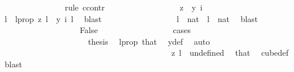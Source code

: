 \begin{isabellebody}
\ \ \ \ \ \ \ \ \ \ \ \ \ \ \isamarkupfalse%
\ {\isacharparenleft}{\kern0pt}rule\ ccontr{\isacharparenright}{\kern0pt}\isanewline
\ \ \ \ \ \ \ \ \ \ \ \ \ \ \ \ \isamarkupfalse%
\ {\isachardoublequoteopen}z\ {\isasymnoteq}\ y\ i{\isachardoublequoteclose}\ \isanewline
\ \ \ \ \ \ \ \ \ \ \ \ \ \ \ \ \isamarkupfalse%
\ \isamarkupfalse%
\ l\ \ l{\isacharunderscore}{\kern0pt}prop{\isacharcolon}{\kern0pt}\ {\isachardoublequoteopen}z\ l\ {\isasymnoteq}\ y\ i\ l{\isachardoublequoteclose}\ \isamarkupfalse%
\ blast\isanewline
\ \ \ \ \ \ \ \ \ \ \ \ \ \ \ \ \isamarkupfalse%
\ {\isachardoublequoteopen}l\ {\isasymin}\ {\isacharbraceleft}{\kern0pt}{\isachardot}{\kern0pt}{\isachardot}{\kern0pt}{\isacharless}{\kern0pt}{}{\isacharcolon}{\kern0pt}{\isacharcolon}{\kern0pt}nat{\isacharbraceright}{\kern0pt}{\isachardoublequoteclose}\ {\isacharbar}{\kern0pt}\ {\isachardoublequoteopen}l\ {\isasymnotin}\ {\isacharbraceleft}{\kern0pt}{\isachardot}{\kern0pt}{\isachardot}{\kern0pt}{\isacharless}{\kern0pt}{}{\isacharcolon}{\kern0pt}{\isacharcolon}{\kern0pt}nat{\isacharbraceright}{\kern0pt}{\isachardoublequoteclose}\ \isamarkupfalse%
\ blast\isanewline
\ \ \ \ \ \ \ \ \ \ \ \ \ \ \ \ \isamarkupfalse%
\ \isamarkupfalse%
\ False\isanewline
\ \ \ \ \ \ \ \ \ \ \ \ \ \ \ \ \isamarkupfalse%
\ cases\isanewline
\ \ \ \ \ \ \ \ \ \ \ \ \ \ \ \ \ \ \isamarkupfalse%
\ {}\isanewline
\ \ \ \ \ \ \ \ \ \ \ \ \ \ \ \ \ \ \isamarkupfalse%
\ \isamarkupfalse%
\ {\isacharquery}{\kern0pt}thesis\ \isamarkupfalse%
\ l{\isacharunderscore}{\kern0pt}prop\ that{\isacharparenleft}{\kern0pt}{}{\isacharparenright}{\kern0pt}\ \isamarkupfalse%
\ y{\isacharunderscore}{\kern0pt}def\ \isamarkupfalse%
\ auto\isanewline
\ \ \ \ \ \ \ \ \ \ \ \ \ \ \ \ \isamarkupfalse%
\isanewline
\ \ \ \ \ \ \ \ \ \ \ \ \ \ \ \ \ \ \isamarkupfalse%
\ {}\isanewline
\ \ \ \ \ \ \ \ \ \ \ \ \ \ \ \ \ \ \isamarkupfalse%
\ \isamarkupfalse%
\ {\isachardoublequoteopen}z\ l\ {\isacharequal}{\kern0pt}\ undefined{\isachardoublequoteclose}\ \isamarkupfalse%
\ that\ \isamarkupfalse%
\ cube{\isacharunderscore}{\kern0pt}def\ \isamarkupfalse%
\ blast\isanewline
\ \ \ \ \ \ \ \ \ \ \ \ \ \ \ \ \ \ \isamarkupfalse%

\end{isabellebody}
